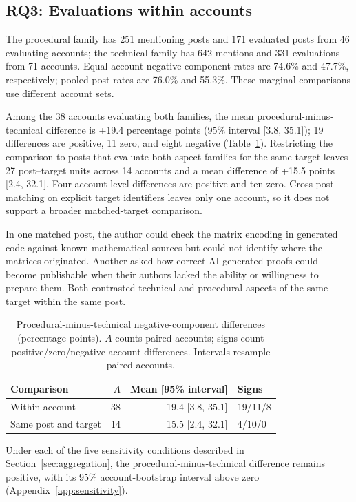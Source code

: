\documentclass[sigconf,balance=false]{acmart}
\begin{document}
\subsection{RQ3: Evaluations within accounts}
The procedural family has 251 mentioning posts and 171 evaluated posts from 46 evaluating accounts; the technical family has 642 mentions and 331 evaluations from 71 accounts. Equal-account negative-component rates are 74.6\% and 47.7\%, respectively; pooled post rates are 76.0\% and 55.3\%. These marginal comparisons use different account sets.

Among the 38 accounts evaluating both families, the mean procedural-minus-technical difference is +19.4 percentage points (95\% interval [3.8, 35.1]); 19 differences are positive, 11 zero, and eight negative (Table~\ref{tab:paired}). Restricting the comparison to posts that evaluate both aspect families for the same target leaves 27 post--target units across 14 accounts and a mean difference of +15.5 points [2.4, 32.1]. Four account-level differences are positive and ten zero. Cross-post matching on explicit target identifiers leaves only one account, so it does not support a broader matched-target comparison.

In one matched post, the author could check the matrix encoding in generated code against known mathematical sources but could not identify where the matrices originated. Another asked how correct AI-generated proofs could become publishable when their authors lacked the ability or willingness to prepare them. Both contrasted technical and procedural aspects of the same target within the same post.

\begin{table}[tp]
\caption{Procedural-minus-technical negative-component differences (percentage points). $A$ counts paired accounts; signs count positive/zero/negative account differences. Intervals resample paired accounts.}
\label{tab:paired}
\centering
\begin{tabularx}{\columnwidth}{Xrrl}
\toprule Comparison & $A$ & Mean [95\% interval] & Signs\\
\midrule
Within account & 38 & 19.4 [3.8, 35.1] & 19/11/8\\
Same post and target & 14 & 15.5 [2.4, 32.1] & 4/10/0\\
\bottomrule
\end{tabularx}
\end{table}

Under each of the five sensitivity conditions described in Section~\ref{sec:aggregation}, the procedural-minus-technical difference remains positive, with its 95\% account-bootstrap interval above zero (Appendix~\ref{app:sensitivity}).
\end{document}
